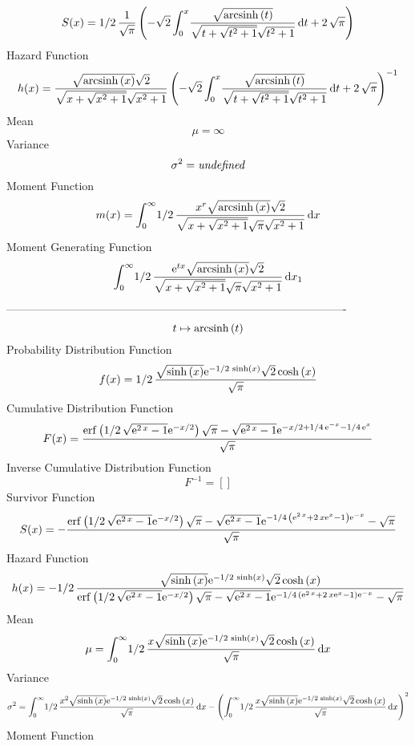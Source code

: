 \documentclass[12pt]{article}
\begin{document}
 $$ S(x)=1/2\,{\frac {1}{\sqrt {\pi}} \left( -\sqrt {2}\int_{0}^{x}\!{\frac {
\sqrt {{\rm arcsinh} \left(t\right)}}{\sqrt {t+\sqrt {{t}^{2}+1}}
\sqrt {{t}^{2}+1}}}\,{\rm d}t+2\,\sqrt {\pi} \right) }
$$ Hazard Function 
 $$ h(x)={\frac {\sqrt {{\rm arcsinh} \left(x\right)}\sqrt {2}}{\sqrt {x+\sqrt 
{{x}^{2}+1}}\sqrt {{x}^{2}+1}} \left( -\sqrt {2}\int_{0}^{x}\!{\frac {
\sqrt {{\rm arcsinh} \left(t\right)}}{\sqrt {t+\sqrt {{t}^{2}+1}}
\sqrt {{t}^{2}+1}}}\,{\rm d}t+2\,\sqrt {\pi} \right) ^{-1}}
$$Mean 
 $$ \mu=\infty 
$$ Variance 
 $$ \sigma^2 = {\it undefined}
$$Moment Function 
 $$ m(x) = \int_{0}^{\infty }\!1/2\,{\frac {{x}^{r}\sqrt {{\rm arcsinh} \left(x
\right)}\sqrt {2}}{\sqrt {x+\sqrt {{x}^{2}+1}}\sqrt {\pi}\sqrt {{x}^{2
}+1}}}\,{\rm d}x
$$ Moment Generating Function 
 $$\int_{0}^{\infty }\!1/2\,{\frac {{{\rm e}^{tx}}\sqrt {{\rm arcsinh} 
\left(x\right)}\sqrt {2}}{\sqrt {x+\sqrt {{x}^{2}+1}}\sqrt {\pi}\sqrt 
{{x}^{2}+1}}}\,{\rm d}x_{{1}}
$$-------------------------------------------------------------------------------------------  \\$$t\mapsto {\rm arcsinh} \left(t\right)
$$Probability Distribution Function 
$$  f(x)=1/2\,{\frac {\sqrt {\sinh \left( x \right) }{{\rm e}^{-1/2\,\sinh
 \left( x \right) }}\sqrt {2}\cosh \left( x \right) }{\sqrt {\pi}}}
$$Cumulative Distribution Function  
 $$F(x)={\frac {{\rm erf} \left(1/2\,\sqrt {{{\rm e}^{2\,x}}-1}{{\rm e}^{-x/2}
}\right)\sqrt {\pi}-\sqrt {{{\rm e}^{2\,x}}-1}{{\rm e}^{-x/2+1/4\,{
{\rm e}^{-x}}-1/4\,{{\rm e}^{x}}}}}{\sqrt {\pi}}}
$$ Inverse Cumulative Distribution Function 
  $$F^{-1} = []
$$Survivor Function 
 $$ S(x)=-{\frac {{\rm erf} \left(1/2\,\sqrt {{{\rm e}^{2\,x}}-1}{{\rm e}^{-x/2
}}\right)\sqrt {\pi}-\sqrt {{{\rm e}^{2\,x}}-1}{{\rm e}^{-1/4\,
 \left( {{\rm e}^{2\,x}}+2\,x{{\rm e}^{x}}-1 \right) {{\rm e}^{-x}}}}-
\sqrt {\pi}}{\sqrt {\pi}}}
$$ Hazard Function 
 $$ h(x)=-1/2\,{\frac {\sqrt {\sinh \left( x \right) }{{\rm e}^{-1/2\,\sinh
 \left( x \right) }}\sqrt {2}\cosh \left( x \right) }{{\rm erf} \left(
1/2\,\sqrt {{{\rm e}^{2\,x}}-1}{{\rm e}^{-x/2}}\right)\sqrt {\pi}-
\sqrt {{{\rm e}^{2\,x}}-1}{{\rm e}^{-1/4\, \left( {{\rm e}^{2\,x}}+2\,
x{{\rm e}^{x}}-1 \right) {{\rm e}^{-x}}}}-\sqrt {\pi}}}
$$Mean 
 $$ \mu=\int_{0}^{\infty }\!1/2\,{\frac {x\sqrt {\sinh \left( x \right) }{
{\rm e}^{-1/2\,\sinh \left( x \right) }}\sqrt {2}\cosh \left( x
 \right) }{\sqrt {\pi}}}\,{\rm d}x
$$ Variance 
 $$ \sigma^2 = \int_{0}^{\infty }\!1/2\,{\frac {{x}^{2}\sqrt {\sinh \left( x \right) 
}{{\rm e}^{-1/2\,\sinh \left( x \right) }}\sqrt {2}\cosh \left( x
 \right) }{\sqrt {\pi}}}\,{\rm d}x- \left( \int_{0}^{\infty }\!1/2\,{
\frac {x\sqrt {\sinh \left( x \right) }{{\rm e}^{-1/2\,\sinh \left( x
 \right) }}\sqrt {2}\cosh \left( x \right) }{\sqrt {\pi}}}\,{\rm d}x
 \right) ^{2}
$$Moment Function 
\end{document}
